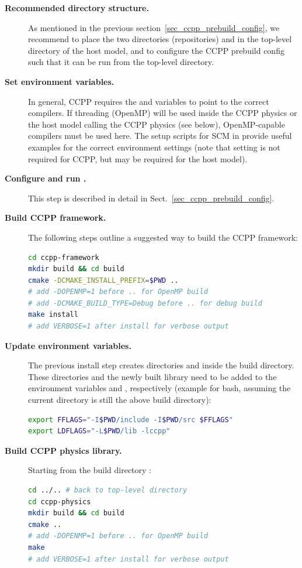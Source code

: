 \begin{description}
\item[\textbf{Recommended directory structure.}] As mentioned in the previous section~\ref{sec_ccpp_prebuild_config}, we recommend to place the two directories (repositories)  and  in the top-level directory of the host model, and to configure the CCPP prebuild config such that it can be run from the top-level directory.
\item[\textbf{Set environment variables.}] In general, CCPP requires the  and  variables to point to the correct compilers. If threading (OpenMP) will be used inside the CCPP physics or the host model calling the CCPP physics (see below), OpenMP-capable compilers must be used here. The setup scripts for SCM in  provide useful examples for the correct environment settings (note that setting  is not required for CCPP, but may be required for the host model).
\item[\textbf{Configure and run .}] This step is described in detail in Sect.~\ref{sec_ccpp_prebuild_config}.
\item[\textbf{Build CCPP framework.}] The following steps outline a suggested way to build the CCPP framework:
\begin{lstlisting}[language=bash]
cd ccpp-framework
mkdir build && cd build
cmake -DCMAKE_INSTALL_PREFIX=$PWD ..
# add -DOPENMP=1 before .. for OpenMP build
# add -DCMAKE_BUILD_TYPE=Debug before .. for debug build
make install
# add VERBOSE=1 after install for verbose output
\end{lstlisting}
\item[\textbf{Update environment variables.}] The previous install step creates directories  and  inside the build directory. These directories and the newly built library  need to be added to the environment variables  and , respectively (example for bash, assuming the current directory is still the above build directory):
\begin{lstlisting}[language=bash]
export FFLAGS="-I$PWD/include -I$PWD/src $FFLAGS"
export LDFLAGS="-L$PWD/lib -lccpp"
\end{lstlisting}
\item[\textbf{Build CCPP physics library.}] Starting from the build directory :
\begin{lstlisting}[language=bash]
cd ../.. # back to top-level directory
cd ccpp-physics
mkdir build && cd build
cmake ..
# add -DOPENMP=1 before .. for OpenMP build
make
# add VERBOSE=1 after install for verbose output
\end{lstlisting}
\end{description}
